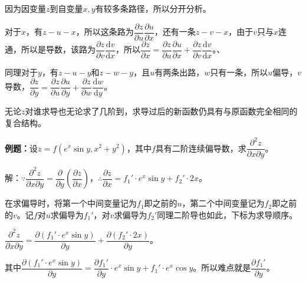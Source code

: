 \begin{minipage}{0.25\linewidth}
\end{minipage}
\hfill
\begin{minipage}{0.65\linewidth}
    因为因变量$z$到自变量$x,y$有较多条路径，所以分开分析。

    对于$x$，有$z-u-x$，所以这条路为$\dfrac{\partial z}{\partial u}\dfrac{\partial u}{\partial x}$，还有一条$z-v-x$，由于$v$只与$x$连通，所以是导数，该路为$\dfrac{\partial z}{\partial v}\dfrac{\textrm{d}v}{\textrm{d}x}$，所以$\dfrac{\partial z}{\partial x}=\dfrac{\partial z}{\partial u}\dfrac{\partial u}{\partial x}+\dfrac{\partial z}{\partial v}\dfrac{\textrm{d}v}{\textrm{d}x}$。、

    同理对于$y$，有$z-u-y$和$z-w-y$，且$u$有两条出路，$w$只有一条，所以$u$偏导，$v$导数，$\dfrac{\partial z}{\partial y}=\dfrac{\partial z}{\partial u}\dfrac{\partial u}{\partial y}+\dfrac{\partial z}{\partial w}\dfrac{\textrm{d}w}{\textrm{d}y}$。
\end{minipage} \medskip

无论$z$对谁求导也无论求了几阶到，求导过后的新函数仍具有与原函数完全相同的复合结构。

\textbf{例题：}设$z=f(e^x\sin y,x^2+y^2)$，其中$f$具有二阶连续偏导数，求$\dfrac{\partial^2z}{\partial x\partial y}$。

解：$\because\dfrac{\partial^2z}{\partial x\partial y}=\dfrac{\partial}{\partial y}\left(\dfrac{\partial z}{\partial x}\right)$，$\therefore\dfrac{\partial z}{\partial x}=f_1'\cdot e^x\sin y+f_2'\cdot2x$。

在求偏导时，将第一个中间变量记为$f_1$即之前的$u$，第二个中间变量记为$f_2$即之前的$v$。记$f$对$u$求偏导为$f_1'$，对$v$求偏导为$f_2'$同理二阶导也如此，下标为求导顺序。

$\dfrac{\partial^2z}{\partial x\partial y}=\dfrac{\partial(f_1'\cdot e^x\sin y)}{\partial y}+\dfrac{\partial(f_2'\cdot2x)}{\partial y}$。

其中$\dfrac{\partial(f_1'\cdot e^x\sin y)}{\partial y}=\dfrac{\partial f_1'}{\partial y}\cdot e^x\sin y+f_1'\cdot e^x\cos y$。所以难点就是$\dfrac{\partial f_1'}{\partial y}$。

